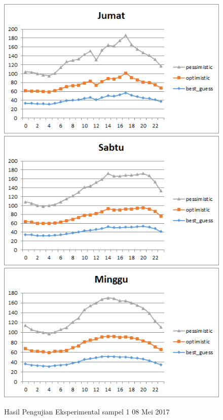 \begin{figure}[H]
				\centering		
				\includegraphics[]{Gambar/jumatsampel115052017.png}
				\includegraphics[]{Gambar/sabtusampel115052017.png}
				\includegraphics[]{Gambar/minggusampel115052017.png}
				\caption[Hasil Pengujian Eksperimental]{Hasil Pengujian Eksperimental sampel 1 08 Mei 2017}
				\label{fig:eksperimentalsampel115052017}
\end{figure}
\newpage
			
